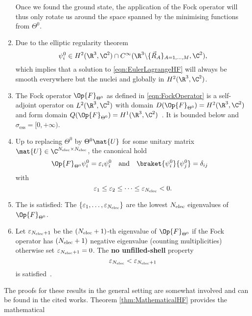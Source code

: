 \begin{thm}
\begin{enumerate}[label=(\alph*)]
			Once we found the ground state, the application of the Fock operator
			will thus only rotate us around the space spanned by the minimising
			functions from $\Theta^0$.
		\item Due to the elliptic regularity theorem~\cite{Lieb1977}
			\[ \psi_i^0 \in H^2(\R^3,\C^2) \cap C^\infty(\R^3 \backslash \{\vec{R}_A\}_{A=1,\ldots,M},\C^2), \]
			which implies that a solution to \eqref{eqn:EulerLagrangeHF}
			will always be smooth everywhere but the nuclei and globally in $H^2(\R^3,\C^2)$.
		\item The Fock operator $\Op{F}_{\Theta^0}$ as defined in \eqref{eqn:FockOperator}
			is a self-adjoint operator on $L^2(\R^3,\C^2)$
			with domain $D(\Op{F}_{\Theta^0}) = H^2(\R^3,\C^2)$
			and form domain $Q(\Op{F}_{\Theta^0}) = H^1(\R^3,\C^2)$~\cite{Lions1987}.
			It is bounded below and $\sigma_\text{ess} =[0, +\infty)$.
		\item Up to replacing $\Theta^0$ by $\Theta^0 \mat{U}$
			for some unitary matrix $\mat{U} \in \C^{\Nelec\times\Nelec}$,
			the canonical  hold
			\begin{align}
				\label{eqn:HFequations}
				\Op{F}_{\Theta^0} \psi_i^0 &= \varepsilon_i \psi_i^0
				&&\text{and}&
				\braket{\psi_i^0}{\psi_j^0} &= \delta_{ij}
			\end{align}
			with
			\[ \varepsilon_1 \leq \varepsilon_2 \leq \cdots \leq \varepsilon_{N_\text{elec}} < 0. \]
		\item The  is satisfied:
			The $\{\varepsilon_1, \ldots,\varepsilon_{N_\text{elec}} \}$
			are the lowest $N_\text{elec}$ eigenvalues of $\Op{F}_{\Theta^0}$.
		\item Let $\varepsilon_{N_\text{elec}+1}$ be the $(N_\text{elec}+1)$-th eigenvalue of $\Op{F}_{\Theta^0}$
			if the Fock operator has $(N_\text{elec}+1)$ negative eigenvalue (counting multiplicities)
			otherwise set $\varepsilon_{N_\text{elec}+1} = 0$.
			The \textbf{no unfilled-shell} property
			\[ \varepsilon_{N_\text{elec}} < \varepsilon_{N_\text{elec}+1} \]
			is satisfied~\cite{Bach1994}.
	\end{enumerate}
\end{thm}
The proofs for these results in the general setting are somewhat involved
and can be found in the cited works.
Theorem \ref{thm:MathematicalHF} provides the mathematical
